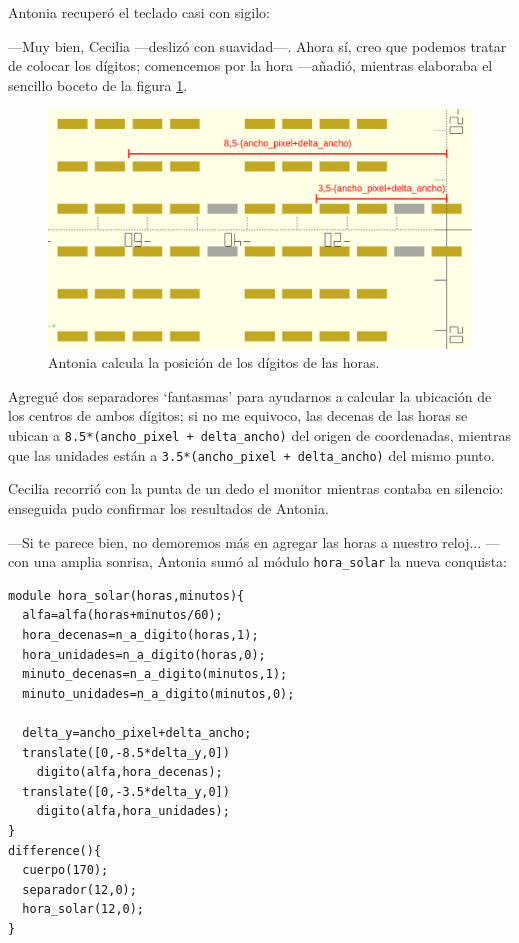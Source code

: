 Antonia recuperó el teclado casi con sigilo:

---Muy bien, Cecilia ---deslizó con suavidad---. Ahora sí, creo que
podemos tratar de colocar los dígitos; comencemos por la hora
---añadió, mientras elaboraba el sencillo boceto de la figura
\ref{fig:horas-completas-posiciones}.

\begin{figure}[ht]
  \centering
  \includegraphics[width=1\textwidth]{imagenes/horas-completas-posiciones}
  \caption{Antonia calcula la posición de los dígitos de las horas.}
  \label{fig:horas-completas-posiciones}
\end{figure}



\guillemotright Agregué dos separadores `fantasmas' para ayudarnos a
calcular la ubicación de los centros de ambos dígitos; si no me
equivoco, las decenas de las horas se ubican a
\lstinline!8.5*(ancho_pixel + delta_ancho)! del origen de coordenadas,
mientras que las unidades están a \lstinline!3.5*(ancho_pixel + delta_ancho)! del mismo punto.

Cecilia recorrió con la punta de un dedo el monitor mientras contaba
en silencio: enseguida pudo confirmar los resultados de Antonia.

---Si te parece bien, no demoremos más en agregar las horas a nuestro
reloj... ---con una amplia sonrisa, Antonia sumó al módulo
\lstinline!hora_solar! la nueva conquista:


\begin{lstlisting}
module hora_solar(horas,minutos){
  alfa=alfa(horas+minutos/60);
  hora_decenas=n_a_digito(horas,1);
  hora_unidades=n_a_digito(horas,0);
  minuto_decenas=n_a_digito(minutos,1);
  minuto_unidades=n_a_digito(minutos,0);
                    
  delta_y=ancho_pixel+delta_ancho;
  translate([0,-8.5*delta_y,0])
    digito(alfa,hora_decenas);
  translate([0,-3.5*delta_y,0])
    digito(alfa,hora_unidades);  
}
difference(){
  cuerpo(170);
  separador(12,0);
  hora_solar(12,0);
}
\end{lstlisting}%

